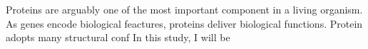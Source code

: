 Proteins are arguably one of the most important component in a living organism. As genes encode biological feactures, proteins deliver biological functions. Protein adopts many structural conf  In this study, I will be 
